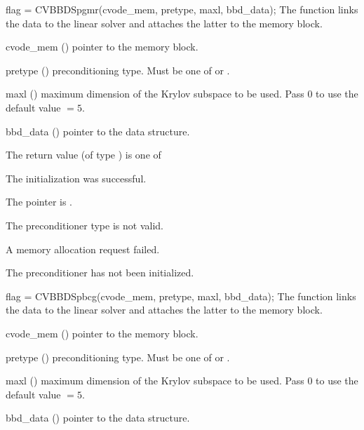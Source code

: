 {
  flag = CVBBDSpgmr(cvode\_mem, pretype, maxl, bbd\_data);
}
{
  The function  links the {\cvbbdpre} data to the
  {\cvspgmr} linear solver and attaches the latter to the {\cvode}
  memory block.
}
{
  \begin{args}
  \item[cvode\_mem] ()
    pointer to the {\cvode} memory block.
  \item[pretype] ()
    preconditioning type. Must be one of  or .
  \item[maxl] ()
    maximum dimension of the Krylov subspace to be used. Pass $0$ to use the 
    default value  $= 5$.
  \item[bbd\_data] ()
    pointer to the {\cvbbdpre} data structure.
  \end{args}
}
{
  The return value  (of type ) is one of
  \begin{args}
  \item[\Id{CVSPGMR\_SUCCESS}] 
    The {\cvspgmr} initialization was successful.
  \item[\Id{CVSPGMR\_MEM\_NULL}]
    The  pointer is .
  \item[\Id{CVSPGMR\_ILL\_INPUT}]
    The preconditioner type  is not valid.
  \item[\Id{CVSPGMR\_MEM\_FAIL}]
    A memory allocation request failed.
  \item[\Id{CV\_PDATA\_NULL}]
    The {\cvbbdpre} preconditioner has not been initialized.
  \end{args}
}
{}
{
  flag = CVBBDSpbcg(cvode\_mem, pretype, maxl, bbd\_data);
}
{
  The function  links the {\cvbbdpre} data to the
  {\cvspbcg} linear solver and attaches the latter to the {\cvode}
  memory block.
}
{
  \begin{args}
  \item[cvode\_mem] ()
    pointer to the {\cvode} memory block.
  \item[pretype] ()
    preconditioning type. Must be one of  or .
  \item[maxl] ()
    maximum dimension of the Krylov subspace to be used. Pass $0$ to use the 
    default value  $= 5$.
  \item[bbd\_data] ()
    pointer to the {\cvbbdpre} data structure.
  \end{args}
}
